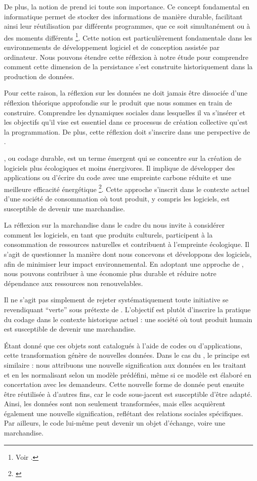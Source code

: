         De plus, la notion de \psdn prend ici toute son importance. Ce concept fondamental en informatique permet de stocker des informations de manière durable, facilitant ainsi leur réutilisation par différents programmes, que ce soit simultanément ou à des moments différents \footnote{Voir \cite{ancona1991}.}. Cette notion est particulièrement fondamentale dans les environnements de développement logiciel et de conception assistée par ordinateur. Nous pouvons étendre cette réflexion à notre étude pour comprendre comment cette dimension de la persistance s'est construite historiquement dans la production de données.
        
        Pour cette raison, la réflexion sur les données ne doit jamais être dissociée d'une réflexion théorique approfondie sur le produit que nous sommes en train de construire. Comprendre les dynamiques sociales dans lesquelles il va s'insérer et les objectifs qu'il vise est essentiel dans ce processus de création collective qu'est la programmation. De plus, cette réflexion doit s'inscrire dans une perspective de \gco.
        
        , ou codage durable, est un terme émergent qui se concentre sur la création de logiciels plus écologiques et moins énergivores. Il implique de développer des applications ou d'écrire du code avec une empreinte carbone réduite et une meilleure efficacité énergétique \footnote{\cite{ibmgreencoding}}. Cette approche s'inscrit dans le contexte actuel d'une société de consommation où tout produit, y compris les logiciels, est susceptible de devenir une marchandise.

        La réflexion sur la marchandise dans le cadre du \gco nous invite à considérer comment les logiciels, en tant que produits culturels, participent à la consommation de ressources naturelles et contribuent à l'empreinte écologique. Il s'agit de questionner la manière dont nous concevons et développons des logiciels, afin de minimiser leur impact environnemental. En adoptant une approche de \gco, nous pouvons contribuer à une économie plus durable et réduire notre dépendance aux ressources non renouvelables.

        Il ne s'agit pas simplement de rejeter systématiquement toute initiative se revendiquant \enquote{verte} sous prétexte de \gwsh. L'objectif est plutôt d'inscrire la pratique du codage dans le contexte historique actuel : une société où tout produit humain est susceptible de devenir une marchandise.

        Étant donné que ces objets sont catalogués à l'aide de codes ou d'applications, cette transformation génère de nouvelles données. Dans le cas du \dsc, le principe est similaire : nous attribuons une nouvelle signification aux données en les traitant et en les normalisant selon un modèle prédéfini, même si ce modèle est élaboré en concertation avec les demandeurs. Cette nouvelle forme de donnée peut ensuite être réutilisée à d'autres fins, car le code sous-jacent est susceptible d'être adapté. Ainsi, les données sont non seulement transformées, mais elles acquièrent également une nouvelle signification, reflétant des relations sociales spécifiques. Par ailleurs, le code lui-même peut devenir un objet d'échange, voire une marchandise.


